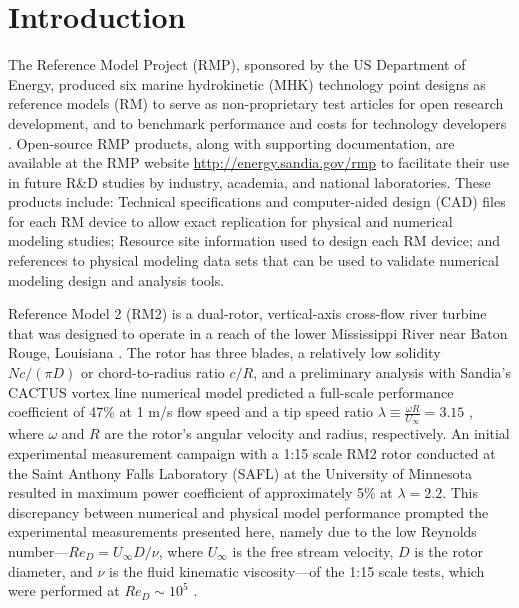 \documentclass[10pt,letterpaper]{article}
\begin{document}
\section*{Introduction}

The Reference Model Project (RMP), sponsored by the US Department of Energy,
produced six marine hydrokinetic (MHK) technology point designs as reference
models (RM) to serve as non-proprietary test articles for open research
development, and to benchmark performance and costs for technology developers
\cite{Neary2014, Neary2014a}. Open-source RMP products, along with supporting
documentation, are available at the RMP website
\url{http://energy.sandia.gov/rmp} to facilitate their use in future R\&D
studies by industry, academia, and national laboratories. These products
include: Technical specifications and computer-aided design (CAD) files for each
RM device to allow exact replication for physical and numerical modeling
studies; Resource site information used to design each RM device; and references
to physical modeling data sets that can be used to validate numerical modeling
design and analysis tools.

Reference Model 2 (RM2) is a dual-rotor, vertical-axis cross-flow river turbine
that was designed to operate in a reach of the lower Mississippi River near
Baton Rouge, Louisiana \cite{Barone2011, Neary2011}. The rotor has three blades,
a relatively low solidity $Nc/(\pi D)$ or chord-to-radius ratio $c/R$, and a
preliminary analysis with Sandia's CACTUS vortex line numerical model
\cite{Murray2011} predicted a full-scale performance coefficient of 47\% at 1
m/s flow speed and a tip speed ratio $\lambda \equiv \frac{\omega R}{U_\infty} =
3.15$ \cite{Barone2011}, where $\omega$ and $R$ are the rotor's angular velocity
and radius, respectively. An initial experimental measurement campaign with a
1:15 scale RM2 rotor conducted at the Saint Anthony Falls Laboratory (SAFL) at
the University of Minnesota resulted in maximum power coefficient of
approximately 5\% at $\lambda = 2.2$. This discrepancy between numerical and
physical model performance prompted the experimental measurements presented
here, namely due to the low Reynolds number---$Re_D = U_\infty D / \nu$, where
$U_\infty$ is the free stream velocity, $D$ is the rotor diameter, and $\nu$ is
the fluid kinematic viscosity---of the 1:15 scale tests, which were performed at
$Re_D \sim 10^5$ \cite{Hill2014}.
\end{document}
